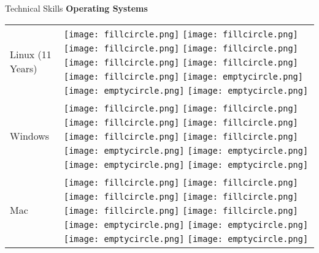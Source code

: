 \documentclass{resume}
\begin{document}
\begin{rSection}{Technical Skills}
{\bf Operating Systems }
\begin{table}[h!]
  \begin{tabular}{p{10cm}p{6cm}}
	Linux (11 Years) & 
  \texttt{[image: fillcircle.png]} 
  \texttt{[image: fillcircle.png]} 
  \texttt{[image: fillcircle.png]}
  \texttt{[image: fillcircle.png]} 
  \texttt{[image: fillcircle.png]}
  \texttt{[image: fillcircle.png]} 
  \texttt{[image: fillcircle.png]}
  \texttt{[image: emptycircle.png]} 
  \texttt{[image: emptycircle.png]} 
  \texttt{[image: emptycircle.png]} \\
	Windows & 
  \texttt{[image: fillcircle.png]} 
  \texttt{[image: fillcircle.png]} 
  \texttt{[image: fillcircle.png]}
  \texttt{[image: fillcircle.png]} 
  \texttt{[image: fillcircle.png]}
  \texttt{[image: fillcircle.png]} 
  \texttt{[image: emptycircle.png]}
  \texttt{[image: emptycircle.png]} 
  \texttt{[image: emptycircle.png]} 
  \texttt{[image: emptycircle.png]} \\
	Mac & 
  \texttt{[image: fillcircle.png]} 
  \texttt{[image: fillcircle.png]} 
  \texttt{[image: fillcircle.png]}
  \texttt{[image: fillcircle.png]} 
  \texttt{[image: fillcircle.png]}
  \texttt{[image: fillcircle.png]} 
  \texttt{[image: emptycircle.png]}
  \texttt{[image: emptycircle.png]} 
  \texttt{[image: emptycircle.png]} 
  \texttt{[image: emptycircle.png]} \\
  \end{tabular}
\end{table}
\end{rSection}
\newpage
\end{document}
